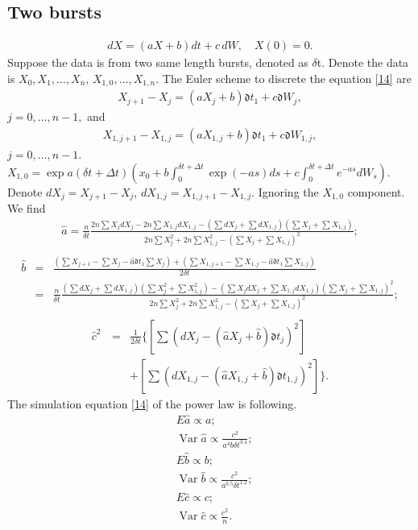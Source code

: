 \documentclass[12pt,reqno, a4paper]{article}
\numberwithin{equation}{section}
\begin{document}
 \subsection{Two bursts}
\begin{eqnarray} \label{14}
dX=(aX+b)dt+c\,dW,   \quad  X(0)=0.
\end{eqnarray}
Suppose the data is from two same length  bursts, denoted as  $\delta $t. Denote the data is $X_0, X_1,\ldots, X_n$, $X_{1,0}, \ldots, X_{1,n}$.
The Euler scheme to discrete the equation \eqref{14} are
\begin{eqnarray*}
X_{j+1}-X_j=(a X_j+b)\mathfrak{d} t_1+c\mathfrak{d} W_j,\end{eqnarray*}
$j=0, \ldots, n-1, $ and
\begin{eqnarray*}
X_{1,j+1}-X_{1,j}=(a X_{1,j}+b)\mathfrak{d} t_1+c\mathfrak{d} W_{1,j},\end{eqnarray*}$j=0,\ldots, n-1 $.  $X_{1, 0}= \exp{a(\delta t+\Delta t)}(x_0+b\int _0^{\delta t+\Delta t}\exp({-as})ds+c\int _0^{\delta t+\Delta t}e^{-as}dW_s)$. Denote $dX_j=X_{j+1}-X_j$, $dX_{1,j}=X_{1,j+1}-X_{1,j}$. Ignoring the $X_{1, 0}$ component.
 We find
\begin{eqnarray}\hat{a}=\frac n {\delta t}  \frac {2n\sum X_{j}dX_j-2n\sum X_{1,j}dX_{1,j}-(\sum dX_j+\sum dX_{1,j}) (\sum X_j+\sum X_{1,j}) }{2n\sum X_j^2+2n\sum X_{1,j}^2-(\sum X_j+\sum X_{1,j})^2};\nonumber \\  \label{1}\end{eqnarray}
\begin{eqnarray}\hat{b}&=&\frac { (\sum X_{j+1}-\sum X_{j}-\hat{a}\mathfrak{d} t_1\sum X_j)+ (\sum X_{1,j+1}-\sum X_{1,j}-\hat{a}\mathfrak{d} t_1\sum X_{1,j})}{2\delta t }\nonumber\\ &=&\frac n {\delta t}  \frac {(\sum dX_j+\sum dX_{1,j})(\sum X_j^2+\sum X_{1,j}^2)-(\sum X_jdX_j+\sum X_{1,j}dX_{1,j})(\sum X_j+\sum X_{1,j})^2 }{2n\sum X_j^2+2n\sum X_{1,j}^2-(\sum X_j+\sum X_{1,j})^2};\nonumber \\ \label{2}\end{eqnarray}
\begin{eqnarray}\hat{c}^2&=&\frac 1 {2\delta t}\bigg \{ \left [\sum { ( dX_{j}-(\hat{a}X_{j}+\hat{b})\mathfrak{d}  t_{j})^2}\right]\nonumber \\ \quad&& +\left[\sum{(dX_{1,j}-(\hat{a}X_{1,j}+\hat{b})\mathfrak{d}  t_{1,j})^2}\right]\bigg \}.\label{3}\end{eqnarray}
The simulation equation \eqref{14} of the power law is following.
 \begin{align*}&E\hat{a}\propto a;\\
 &\operatorname{Var}\hat{a}\propto \frac {c^2}{a^{4}b\delta t^{3.4}};\\
&E\hat{b}\propto b;\\
 &\operatorname{Var}\hat{b}\propto \frac {c^2}{a^{0.5}\delta t^{1.2}};\\
& E\hat{c}\propto c;\\
 &\operatorname{Var}\hat{c}\propto \frac {c^2}{n}.\\
 \end{align*}
\end{document}
